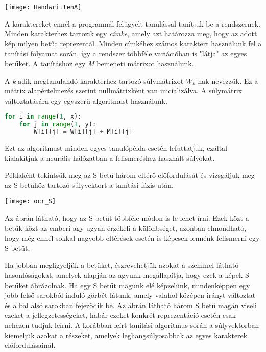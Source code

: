 \begin{center}
	\texttt{[image: HandwrittenA]}
\end{center}

A karaktereket ennél a programnál felügyelt tanulással tanítjuk be a rendszernek. Minden karakterhez tartozik egy \textit{címke}, amely azt határozza meg, hogy az adott kép milyen betűt reprezentál. Minden címkéhez számos karaktert használunk fel a tanítási folyamat során, így a rendszer többféle variációban is "látja" az egyes betűket. A tanításhoz egy \textit{M} bemeneti mátrixot használunk.

A \textit{k}-adik megtanulandó karakterhez tartozó súlymátrixot \(W_k\)-nak nevezzük. Ez a mátrix alapértelmezés szerint nullmátrixként van inicializálva. A súlymátrix változtatására egy egyszerű algoritmust használunk.

\begin{lstlisting}[language=Python]
for i in range(1, x):
	for j in range(1, y):
		W[i][j] = W[i][j] + M[i][j]
\end{lstlisting}

Ezt az algoritmust minden egyes tanulópélda esetén lefuttatjuk, ezáltal kialakítjuk a neurális hálózatban a felismeréshez használt súlyokat.

Példaként tekintsük meg az S betű három eltérő előfordulását és vizsgáljuk meg az S betűhöz tartozó súlyvektort a tanítási fázis után.

\begin{center}
\texttt{[image: ocr\_S]}
\end{center}

Az ábrán látható, hogy az S betűt többféle módon is le lehet írni. Ezek közt a betűk közt az emberi agy ugyan érzékeli a különbséget, azonban elmondható, hogy még ennél sokkal nagyobb eltérések esetén is képesek lennénk felismerni egy S betűt.

Ha jobban megfigyeljük a betűket, észrevehetjük azokat a szemmel látható hasonlóságokat, amelyek alapján az agyunk megállapítja, hogy ezek a képek S betűket ábrázolnak. Ha egy S betűt magunk elé képzelünk, mindenképpen egy jobb felső sarokból induló görbét látunk, amely valahol középen irányt változtat és a bal alsó sarokban fejeződik be. Az ábrán látható három S betű magán viseli ezeket a jellegzetességeket, habár ezeket konkrét reprezentáció esetén csak nehezen tudjuk leírni. A korábban leírt tanítási algoritmus során a súlyvektorban kiemeljük azokat a részeket, amelyek leghangsúlyosabbak az egyes karakterek előfordulásainál.


